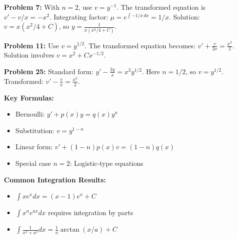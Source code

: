 \documentclass[12pt]{article}
\begin{document}
\textbf{Problem 7:} With $n = 2$, use $v = y^{-1}$. The transformed equation is $v' - v/x = -x^2$.
Integrating factor: $\mu = e^{\int -1/x \, dx} = 1/x$.
Solution: $v = x(x^2/4 + C)$, so $y = \frac{1}{x(x^2/4 + C)}$.

\textbf{Problem 11:} Use $v = y^{1/2}$. The transformed equation becomes:
$v' + \frac{v}{2x} = \frac{x^2}{2}$. Solution involves $v = x^2 + Cx^{-1/2}$.

\textbf{Problem 25:} Standard form: $y' - \frac{2y}{x} = x^3y^{1/2}$.
Here $n = 1/2$, so $v = y^{1/2}$. Transformed: $v' - \frac{v}{x} = \frac{x^3}{2}$.

\textbf{Key Formulas:}
\begin{itemize}
    \item Bernoulli: $y' + p(x)y = q(x)y^n$
    \item Substitution: $v = y^{1-n}$
    \item Linear form: $v' + (1-n)p(x)v = (1-n)q(x)$
    \item Special case $n = 2$: Logistic-type equations
\end{itemize}

\textbf{Common Integration Results:}
\begin{itemize}
    \item $\int xe^x dx = (x-1)e^x + C$
    \item $\int x^ne^{ax} dx$ requires integration by parts
    \item $\int \frac{1}{x^2 + a^2} dx = \frac{1}{a}\arctan(x/a) + C$
\end{itemize}
\end{document}
